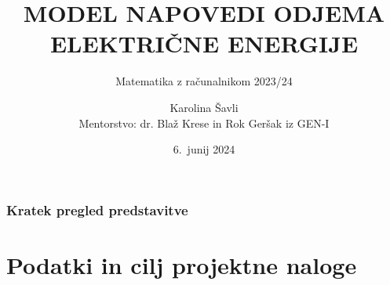 \documentclass[14p, hyperref={unicode}]{beamer}
\title[Model napovedi odjema]{MODEL NAPOVEDI ODJEMA ELEKTRIČNE ENERGIJE}
\subtitle{Matematika z računalnikom 2023/24}
\author[Karolina Šavli]{Karolina Šavli \\ Mentorstvo: dr. Blaž Krese in Rok Geršak iz GEN-I}
\date{6.~junij 2024}
\begin{document}






\begin{frame}

    \titlepage

\end{frame}




\begin{frame}

    \frametitle{Kratek pregled predstavitve}
    \tableofcontents

\end{frame} 



 
\section{Podatki in cilj projektne naloge}


\end{document}
